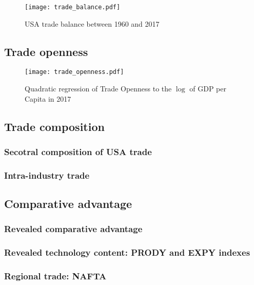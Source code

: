 \documentclass[../main.tex]{subfiles}
\begin{document}
\begin{figure}[H]
\texttt{[image: trade\_balance.pdf]}
\caption{USA trade balance between 1960 and 2017}
\end{figure}

\subsection{Trade openness}

\begin{figure}[H]
\texttt{[image: trade\_openness.pdf]}
\caption{Quadratic regression of Trade Openness to the $\log$ of GDP per Capita in 2017}
\end{figure}


\subsection{Trade composition}

\subsubsection{Secotral composition of USA trade}


\subsubsection{Intra-industry trade}


\subsection{Comparative advantage}

\subsubsection{Revealed comparative advantage}


\subsubsection{Revealed technology content: PRODY and EXPY indexes}

\subsubsection{Regional trade: NAFTA}

\end{document}
